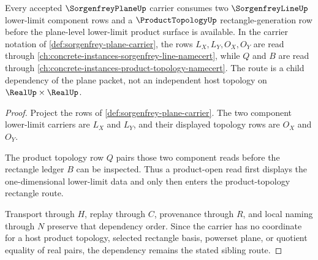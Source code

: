 \begin{theorem}
\label{thm:sorgenfrey-plane-sibling-dependency-route}
Every accepted $\SorgenfreyPlaneUp$ carrier consumes two $\SorgenfreyLineUp$ lower-limit component rows and a $\ProductTopologyUp$ rectangle-generation row before the plane-level lower-limit product surface is available. In the carrier notation of \autoref{def:sorgenfrey-plane-carrier}, the rows $L_X,L_Y,O_X,O_Y$ are read through \autoref{ch:concrete-instances-sorgenfrey-line-namecert}, while $Q$ and $B$ are read through \autoref{ch:concrete-instances-product-topology-namecert}. The route is a child dependency of the plane packet, not an independent host topology on $\RealUp \times \RealUp$.
\end{theorem}
\begin{proof}
Project the rows of \autoref{def:sorgenfrey-plane-carrier}. The two component lower-limit carriers are $L_X$ and $L_Y$, and their displayed topology rows are $O_X$ and $O_Y$.

The product topology row $Q$ pairs those two component reads before the rectangle ledger $B$ can be inspected. Thus a product-open read first displays the one-dimensional lower-limit data and only then enters the product-topology rectangle route.

Transport through $H$, replay through $C$, provenance through $R$, and local naming through $N$ preserve that dependency order. Since the carrier has no coordinate for a host product topology, selected rectangle basis, powerset plane, or quotient equality of real pairs, the dependency remains the stated sibling route.
\end{proof}
